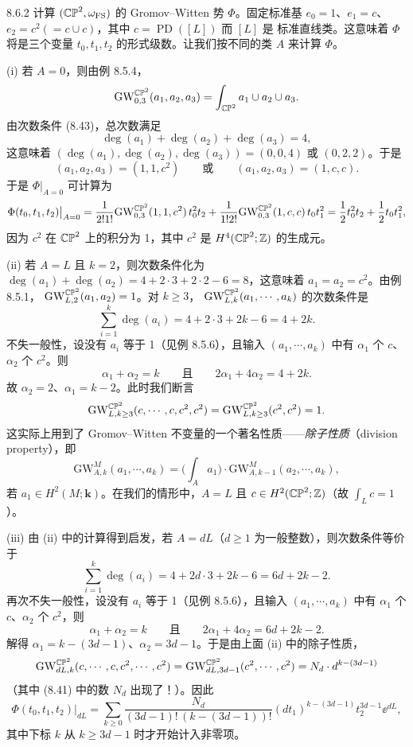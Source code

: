 \begin{wexam}{8.6.2}
计算 $(\mathbb{CP}^2,\omega_{\mathrm{FS}})$ 的 Gromov--Witten 势 $\Phi$。固定标准基
$e_0=1$、$e_1=c$、$e_2=c^2(=c\cup c)$，其中 $c=\operatorname{PD}([L])$ 而 $[L]$ 是
标准直线类。这意味着 $\Phi$ 将是三个变量 $t_0,t_1,t_2$ 的形式级数。让我们按不同的类
$A$ 来计算 $\Phi$。

(i) 若 $A=0$，则由例 8.5.4，
\[
  \mathrm{GW}^{\mathbb{CP}^2}_{0,3}(a_1,a_2,a_3)=\int_{\mathbb{CP}^2}a_1\cup a_2\cup a_3 .
\]
由次数条件 (8.43)，总次数满足
\[
  \deg(a_1)+\deg(a_2)+\deg(a_3)=4,
\]
这意味着 $(\deg(a_1),\deg(a_2),\deg(a_3))=(0,0,4)$ 或 $(0,2,2)$。于是
\[
  (a_1,a_2,a_3)=(1,1,c^2)
  \qquad\text{或}\qquad
  (a_1,a_2,a_3)=(1,c,c).
\]
于是 $\Phi\big|_{A=0}$ 可计算为
\[
  \Phi(t_0,t_1,t_2)\big|_{A=0}
  =\frac{1}{2!1!}\mathrm{GW}^{\mathbb{CP}^2}_{0,3}(1,1,c^2)\,t_0^2t_2
  +\frac{1}{1!2!}\mathrm{GW}^{\mathbb{CP}^2}_{0,3}(1,c,c)\,t_0t_1^2
  =\frac12t_0^2t_2+\frac12t_0t_1^2,
\]
因为 $c^2$ 在 $\mathbb{CP}^2$ 上的积分为 1，其中 $c^2$ 是 $H^4(\mathbb{CP}^2;\mathbb{Z})$ 的生成元。

(ii) 若 $A=L$ 且 $k=2$，则次数条件化为
$\deg(a_1)+\deg(a_2)=4+2\cdot3+2\cdot2-6=8$，这意味着 $a_1=a_2=c^2$。由例 8.5.1，
$\mathrm{GW}^{\mathbb{CP}^2}_{L,2}(a_1,a_2)=1$。对 $k\ge3$，
$\mathrm{GW}^{\mathbb{CP}^2}_{L,k}(a_1,\cdots,a_k)$ 的次数条件是
\[
  \sum_{i=1}^k\deg(a_i)=4+2\cdot3+2k-6=4+2k .
\]
不失一般性，设没有 $a_i$ 等于 1（见例 8.5.6），且输入 $(a_1,\cdots,a_k)$ 中有
$\alpha_1$ 个 $c$、$\alpha_2$ 个 $c^2$。则
\[
  \alpha_1+\alpha_2=k\qquad\text{且}\qquad 2\alpha_1+4\alpha_2=4+2k .
\]
故 $\alpha_2=2$、$\alpha_1=k-2$。此时我们断言
\[
  \mathrm{GW}^{\mathbb{CP}^2}_{L,k\ge3}(c,\cdots,c,c^2,c^2)
  =\mathrm{GW}^{\mathbb{CP}^2}_{L,k\ge3}(c^2,c^2)=1 .
\]
这实际上用到了 Gromov--Witten 不变量的一个著名性质——\emph{除子性质}（division
property），即
\[
  \mathrm{GW}^M_{A,k}(a_1,\cdots,a_k)
  =\Big(\int_Aa_1\Big)\cdot\mathrm{GW}^M_{A,k-1}(a_2,\cdots,a_k),
\]
若 $a_1\in H^2(M;\mathbf{k})$。在我们的情形中，$A=L$ 且
$c\in H^2(\mathbb{CP}^2;\mathbb{Z})$（故 $\int_Lc=1$）。

(iii) 由 (ii) 中的计算得到启发，若 $A=dL$（$d\ge1$ 为一般整数），则次数条件等价于
\[
  \sum_{i=1}^k\deg(a_i)=4+2d\cdot3+2k-6=6d+2k-2 .
\]
再次不失一般性，设没有 $a_i$ 等于 1（见例 8.5.6），且输入 $(a_1,\cdots,a_k)$ 中有
$\alpha_1$ 个 $c$、$\alpha_2$ 个 $c^2$，则
\[
  \alpha_1+\alpha_2=k\qquad\text{且}\qquad 2\alpha_1+4\alpha_2=6d+2k-2 .
\]
解得 $\alpha_1=k-(3d-1)$、$\alpha_2=3d-1$。于是由上面 (ii) 中的除子性质，
\[
  \mathrm{GW}^{\mathbb{CP}^2}_{dL,k}(c,\cdots,c,c^2,\cdots,c^2)
  =\mathrm{GW}^{\mathbb{CP}^2}_{dL,3d-1}(c^2,\cdots,c^2)
  =N_d\cdot d^{k-(3d-1)}
\]
（其中 (8.41) 中的数 $N_d$ 出现了！）。因此
\[
  \Phi(t_0,t_1,t_2)\big|_{dL}
  =\sum_{k\ge0}\frac{N_d}{(3d-1)!\,(k-(3d-1))!}
  (dt_1)^{k-(3d-1)}t_2^{3d-1}\ee^{dL},
\]
其中下标 $k$ 从 $k\ge3d-1$ 时才开始计入非零项。


\end{wexam}
